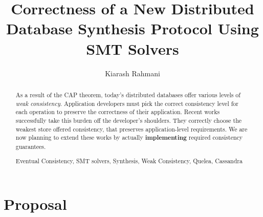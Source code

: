 \documentclass[runningheads,a4paper]{llncs}
\newcommand{\keywords}[1]{\par\addvspace\baselineskip
\noindent\keywordname\enspace\ignorespaces#1}
\begin{document}
\mainmatter  %

\title{Correctness of a New Distributed Database Synthesis Protocol Using SMT Solvers}

\titlerunning{}

%
%

\author{Kiarash Rahmani}
%



%
%

\maketitle


\begin{abstract}
As a result of the CAP theorem, today's distributed databases offer various levels of \emph{weak consistency}. Application developers must pick the correct consistency level for each operation to preserve the correctness of their application. Recent  works\cite{quelea} successfully take this burden off the developer's shoulders. They correctly choose the weakest store offered consistency, that preserves application-level requirements. We are now planning to extend these works by actually {\bf implementing} required consistency guarantees.

\keywords{Eventual Consistency, SMT solvers, Synthesis, Weak Consistency, Quelea, Cassandra }
\end{abstract}

\section{Proposal}
\end{document}
